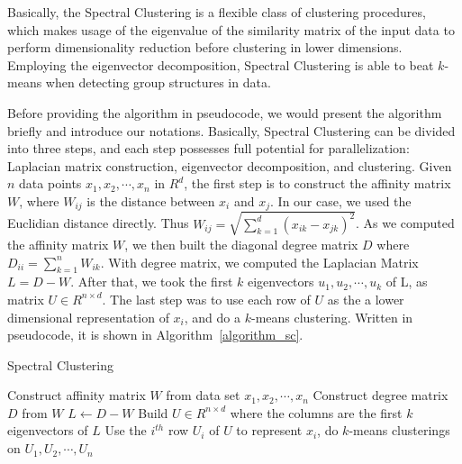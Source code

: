 \documentclass{acm_proc_article-sp}
\begin{document}
Basically, the Spectral Clustering is a flexible class of clustering procedures, which makes usage of the eigenvalue of the similarity matrix of the input data to perform dimensionality reduction before clustering in lower dimensions. Employing the eigenvector decomposition, Spectral Clustering is able to beat $k$-means when detecting group structures in data.

Before providing the algorithm in pseudocode, we would present the algorithm briefly and introduce our notations. Basically, Spectral Clustering can be divided into three steps, and each step possesses full potential for parallelization: Laplacian matrix construction, eigenvector decomposition, and clustering. Given $n$ data points $x_1, x_2, \cdots, x_n$ in $R^d$, the first step is to construct the affinity matrix $W$, where $W_{ij}$ is the distance between $x_i$ and $x_j$. In our case, we used the Euclidian distance directly. Thus $W_{ij} = \sqrt{\sum_{k=1}^d(x_{ik} - x_{jk})^2}$. As we computed the affinity matrix $W$, we then built the diagonal degree matrix $D$ where $D_{ii} = \sum_{k=1}^nW_{ik}$. With degree matrix, we computed the Laplacian Matrix $L = D - W$. After that, we took the first $k$ eigenvectors $u_1, u_2, \cdots, u_k$ of L, as matrix $U \in R^{n\times d}$. The last step was to use each row of $U$ as the a lower dimensional representation of $x_i$, and do a $k$-means clustering. 
Written in pseudocode, it is shown in Algorithm~\ref{algorithm_sc}.
\begin{algorithm}
\caption{Spectral Clustering}
\label{CHalgorithm}
\begin{algorithmic}[1]
\State Construct affinity matrix $W$ from data set $x_1, x_2, \cdots, x_n$
\State Construct degree matrix $D$ from $W$
\State $L \leftarrow D - W$
\State Build $U \in R^{n \times d}$ where the columns are the first $k$ eigenvectors of $L$ 
\State Use the $i^{th}$ row $U_i$ of $U$ to represent $x_i$, do $k$-means clusterings on $U_1, U_2, \cdots, U_n$
\end{algorithmic}
\label{algorithm_sc}
\end{algorithm}
\end{document}
